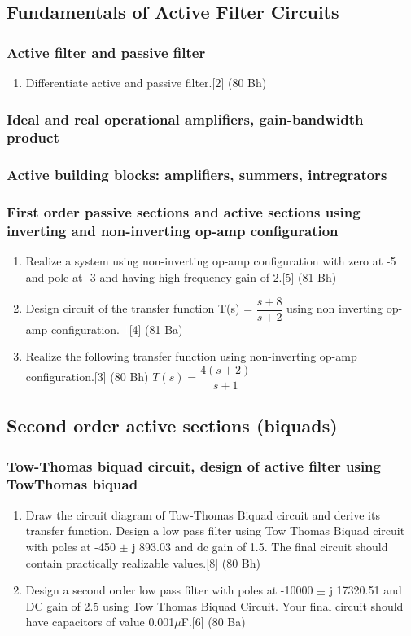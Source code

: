 \documentclass[12pt]{article}
\begin{document}
\subsection{Fundamentals of Active Filter Circuits}
\subsubsection{Active filter and passive filter}
\begin{enumerate}
\item Differentiate active and passive filter.\hfill [2] (80 Bh)
\end{enumerate}
\subsubsection{Ideal and real operational amplifiers, gain-bandwidth product}
\subsubsection{Active building blocks: amplifiers, summers, intregrators}
\subsubsection{First order passive sections and active sections using inverting and non-inverting op-amp configuration}
\begin{enumerate}
\item Realize a system using non-inverting op-amp configuration with zero at -5 and pole at -3 and having high frequency gain of 2.\hfill[5] (81 Bh)
\item Design circuit of the transfer function T(s) = $\dfrac{s+8}{s+2}$ using non inverting op-amp configuration. \textcolor{white}{1}\hfill [4] (81 Ba)
\item Realize the following transfer function using non-inverting op-amp configuration.\hfill [3] (80 Bh)
$T(s) = \dfrac{4(s+2)}{s+1}$
\end{enumerate}
\subsection{Second order active sections (biquads)}
\subsubsection{Tow-Thomas biquad circuit, design of active filter using TowThomas biquad}
\begin{enumerate}
\item Draw the circuit diagram of Tow-Thomas Biquad circuit and derive its transfer function. Design a low pass filter using Tow Thomas Biquad circuit with poles at -450 $\pm$ j 893.03 and dc gain of 1.5. The final circuit should contain practically realizable values.\hfill [8] (80 Bh)
\item Design a second order low pass filter with poles at -10000 $\pm$ j 17320.51 and DC gain of 2.5 using Tow Thomas Biquad Circuit. Your final circuit should have capacitors of value 0.001$\mu$F.\hfill [6] (80 Ba)
\end{enumerate}
\end{document}
